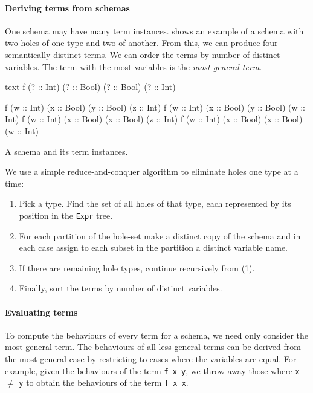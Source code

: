 \paragraph{Deriving terms from schemas}
One schema may have many term instances.   shows
an example of a schema with two holes of one type and two of another.
From this, we can produce four semantically distinct terms.  We can
order the terms by number of distinct variables.  The term with the
most variables is the \emph{most general term}.

\begin{listing}
\centering
\begin{cminted}{text}
f (? :: Int) (? :: Bool) (? :: Bool) (? :: Int)

f (w :: Int) (x :: Bool) (y :: Bool) (z :: Int)
f (w :: Int) (x :: Bool) (y :: Bool) (w :: Int)
f (w :: Int) (x :: Bool) (x :: Bool) (z :: Int)
f (w :: Int) (x :: Bool) (x :: Bool) (w :: Int)
\end{cminted}
\caption{A schema and its term instances.}\label{lst:schematerms}
\end{listing}

We use a simple reduce-and-conquer algorithm to eliminate holes one
type at a time:

\begin{enumerate}
\item Pick a type.  Find the set of all holes of that type, each
  represented by its position in the \verb|Expr| tree.
\item For each partition of the hole-set make a distinct copy of the
  schema and in each case assign to each subset in the partition a
  distinct variable name.
\item If there are remaining hole types, continue recursively from
  (1).
\item Finally, sort the terms by number of distinct variables.
\end{enumerate}

\paragraph{Evaluating terms}
To compute the behaviours of every term for a schema, we need only
consider the most general term.  The behaviours of all less-general
terms can be derived from the most general case by restricting to
cases where the variables are equal.  For example, given the
behaviours of the term \verb|f x y|, we throw away those where
\verb|x| $\neq$ \verb|y| to obtain the behaviours of the term
\verb|f x x|.

